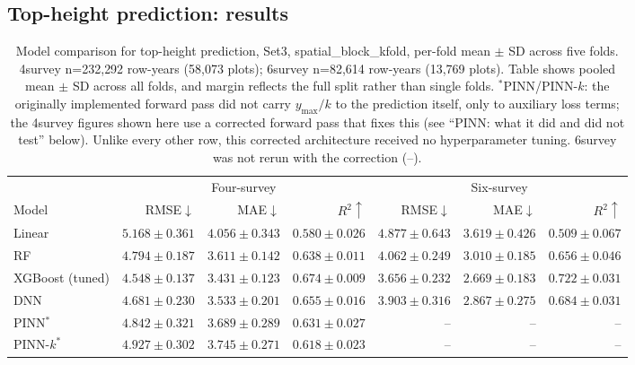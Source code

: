 \documentclass[logo,msc,ai]{infthesis}           %
\begin{document}
\subsection{Top-height prediction: results}
\begin{table}[!htbp]
\centering
\scriptsize
\setlength{\tabcolsep}{4pt}
\renewcommand{\arraystretch}{1.2}
\begin{tabular}{lrrrrrr}
\toprule
& \multicolumn{3}{c}{Four-survey} & \multicolumn{3}{c}{Six-survey} \\
\cmidrule(lr){2-4} \cmidrule(lr){5-7}
Model & RMSE${\downarrow}$ & MAE${\downarrow}$ & $R^2{\uparrow}$ & RMSE${\downarrow}$ & MAE${\downarrow}$ & $R^2{\uparrow}$ \\
\midrule
Linear & $5.168{\pm}0.361$ & $4.056{\pm}0.343$ & $0.580{\pm}0.026$ & $4.877{\pm}0.643$ & $3.619{\pm}0.426$ & $0.509{\pm}0.067$ \\
RF & $4.794{\pm}0.187$ & $3.611{\pm}0.142$ & $0.638{\pm}0.011$ & $4.062{\pm}0.249$ & $3.010{\pm}0.185$ & $0.656{\pm}0.046$ \\
XGBoost (tuned) & $\mathbf{4.548{\pm}0.137}$ & $\mathbf{3.431{\pm}0.123}$ & $\mathbf{0.674{\pm}0.009}$ & $\mathbf{3.656{\pm}0.232}$ & $\mathbf{2.669{\pm}0.183}$ & $\mathbf{0.722{\pm}0.031}$ \\
DNN & $4.681{\pm}0.230$ & $3.533{\pm}0.201$ & $0.655{\pm}0.016$ & $3.903{\pm}0.316$ & $2.867{\pm}0.275$ & $0.684{\pm}0.031$ \\
PINN$^*$ & $4.842{\pm}0.321$ & $3.689{\pm}0.289$ & $0.631{\pm}0.027$ & -- & -- & -- \\
PINN-$k^*$ & $4.927{\pm}0.302$ & $3.745{\pm}0.271$ & $0.618{\pm}0.023$ & -- & -- & -- \\
\bottomrule
\end{tabular}
\caption{Model comparison for top-height prediction, Set3, spatial\_block\_kfold,
per-fold mean $\pm$ SD across five folds. 4survey n=232{,}292 row-years (58{,}073
plots); 6survey n=82{,}614 row-years (13{,}769 plots). Table shows pooled mean $\pm$ SD across all folds, and margin reflects the full split rather than single folds.
$^*$PINN/PINN-$k$: the originally implemented forward pass did not carry
$y_{\max}/k$ to the prediction itself, only to auxiliary loss terms; the
4survey figures shown here use a corrected forward pass that fixes this (see
``PINN: what it did and did not test'' below). Unlike every other row, this
corrected architecture received no hyperparameter tuning. 6survey was not
rerun with the correction (--).}
\label{tab:results-rq1}
\end{table}
\end{document}
